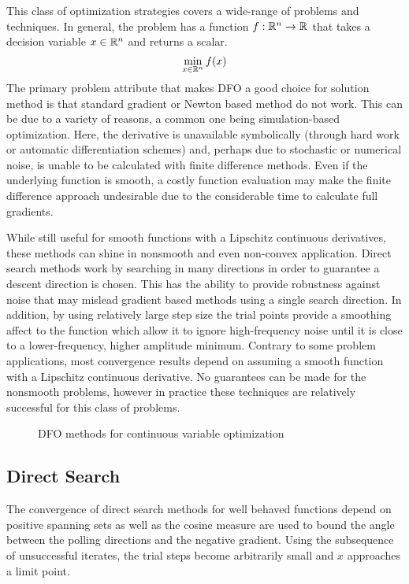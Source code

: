 This class of optimization strategies covers a wide-range of problems and techniques.  In general, the problem has a function $f: \mathbb{R}^{n} \rightarrow \mathbb{R}^{}$ that takes a decision variable $x \in \mathbb{R}^{n}$ and returns a scalar. 
\begin{equation}
\min_{x \in \mathbb{R}^{n}} f(x)
\end{equation}
The primary problem attribute that makes DFO a good choice for solution method is that standard gradient or Newton based method do not work.  This can be due to a variety of reasons, a common one being simulation-based optimization.  Here, the derivative is unavailable symbolically (through hard work or automatic differentiation schemes) and, perhaps due to stochastic or numerical noise, is unable to be calculated with finite difference methods.  Even if the underlying function is smooth, a costly function evaluation may make the finite difference approach undesirable due to the considerable time to calculate full gradients.

While still useful for smooth functions with a Lipschitz continuous derivatives, these methods can shine in nonsmooth and even non-convex application.  Direct search methods work by searching in many directions in order to guarantee a descent direction is chosen.  This has the ability to provide robustness against noise that may mislead gradient based methods using a single search direction.  In addition, by using relatively large step size the trial points provide a smoothing affect to the function which allow it to ignore high-frequency noise until it is close to a lower-frequency, higher amplitude minimum.  Contrary to some problem applications, most convergence results depend on assuming a smooth function with a Lipschitz continuous derivative.  No guarantees can be made for the nonsmooth problems, however in practice these techniques are relatively successful for this class of problems.

\begin{figure}
\centering

\caption{DFO methods for continuous variable optimization}
\end{figure}

\subsection{Direct Search}
The convergence of direct search methods for well behaved functions depend on positive spanning sets as well as the cosine measure are used to bound the angle between the polling directions and the negative gradient.  Using the subsequence of unsuccessful iterates, the trial steps become arbitrarily small and $x$ approaches a limit point.

